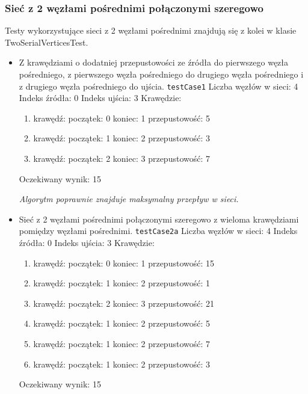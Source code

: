 \subsubsection{Sieć z 2 węzłami pośrednimi połączonymi szeregowo}
Testy wykorzystujące sieci z 2 węzłami pośrednimi znajdują się z kolei w klasie
TwoSerialVerticesTest.
\begin{itemize}[nosep]
    \item Z krawędziami o dodatniej przepustowości ze źródła do pierwszego węzła
    pośredniego, z pierwszego węzła pośredniego do drugiego węzła pośredniego i z
    drugiego węzła pośredniego do ujścia.
    \texttt{testCase1}
    Liczba węzłów w sieci: 4
    Indeks źródła: 0
    Indeks ujścia: 3
    Krawędzie:
    \begin{enumerate}[nosep]
        \item krawędź:
        początek: 0
        koniec: 1
        przepustowość: 5
        \item krawędź:
        początek: 1
        koniec: 2
        przepustowość: 3
        \item krawędź:
        początek: 2
        koniec: 3
        przepustowość: 7
    \end{enumerate}
    Oczekiwany wynik: 15

    \emph{Algorytm
    poprawnie znajduje maksymalny przepływ w sieci.}

    \item Sieć z 2 węzłami pośrednimi połączonymi szeregowo z wieloma
    krawędziami pomiędzy węzłami pośrednimi.
    \texttt{testCase2a}
    Liczba węzłów w sieci: 4
    Indeks źródła: 0
    Indeks ujścia: 3
    Krawędzie:
    \begin{enumerate}[nosep]
        \item krawędź:
        początek: 0
        koniec: 1
        przepustowość: 15
        \item krawędź:
        początek: 1
        koniec: 2
        przepustowość: 1
        \item krawędź:
        początek: 2
        koniec: 3
        przepustowość: 21
        \item krawędź:
        początek: 1
        koniec: 2
        przepustowość: 5
        \item krawędź:
        początek: 1
        koniec: 2
        przepustowość: 7
        \item krawędź:
        początek: 1
        koniec: 2
        przepustowość: 3
    \end{enumerate}
    Oczekiwany wynik: 15


\end{itemize}
